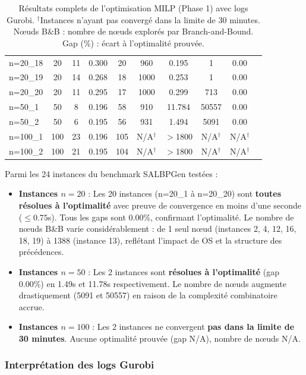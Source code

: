 \documentclass{article}
\begin{document}
\begin{table}[h!]
\begin{tabular}{l c c c c c c c c c}
n=20\_18 & 20 & 11 & 0.300 & 20 & 960  & 0.195 & 1 & 0.00 \\
n=20\_19 & 20 & 14 & 0.268 & 18 & 1000 & 0.253 & 1 & 0.00 \\
n=20\_20 & 20 & 11 & 0.295 & 17 & 1000 & 0.299 & 713 & 0.00 \\
\midrule
n=50\_1  & 50 & 8  & 0.196 & 58 & 910  & 11.784 & 50557 & 0.00 \\
n=50\_2  & 50 & 6  & 0.195 & 56 & 931  & 1.494 & 5091 & 0.00 \\
\midrule
n=100\_1 & 100 & 23 & 0.196 & 105 & N/A$^\dagger$ & $>$1800 & N/A$^\dagger$ & N/A$^\dagger$ \\
n=100\_2 & 100 & 21 & 0.195 & 104 & N/A$^\dagger$ & $>$1800 & N/A$^\dagger$ & N/A$^\dagger$  \\
\bottomrule
\end{tabular}
\caption{Résultats complets de l'optimisation MILP (Phase 1) avec logs Gurobi. $^\dagger$Instances n'ayant pas convergé dans la limite de 30 minutes. Nœuds B\&B : nombre de nœuds explorés par Branch-and-Bound. Gap (\%) : écart à l'optimalité prouvée.}
\label{tab:results}
\end{table}

Parmi les 24 instances du benchmark SALBPGen testées :
\begin{itemize}
    \item \textbf{Instances $n=20$} : Les 20 instances (n=20\_1 à n=20\_20) sont \textbf{toutes résolues à l'optimalité} avec preuve de convergence en moins d'une seconde ($\leq 0.75$s). Tous les gaps sont 0.00\%, confirmant l'optimalité. Le nombre de nœuds B\&B varie considérablement : de 1 seul nœud (instances 2, 4, 12, 16, 18, 19) à 1388 (instance 13), reflétant l'impact de OS et la structure des précédences.
    \item \textbf{Instances $n=50$} : Les 2 instances sont \textbf{résolues à l'optimalité} (gap 0.00\%) en 1.49s et 11.78s respectivement. Le nombre de nœuds augmente drastiquement (5091 et 50557) en raison de la complexité combinatoire accrue.
    \item \textbf{Instances $n=100$} : Les 2 instances ne convergent \textbf{pas dans la limite de 30 minutes}. Aucune optimalité prouvée (gap N/A), nombre de nœuds N/A.
\end{itemize}

\subsubsection{Interprétation des logs Gurobi}
\end{document}
